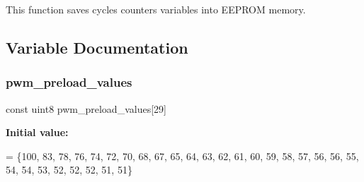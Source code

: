 This function saves cycles counters variables into E\+E\+P\+R\+OM memory. 

\subsection{Variable Documentation}
\mbox{\label{interruptions_8c_aee1865719263cf20251f918e8825703d}} 
\subsubsection{pwm\+\_\+preload\+\_\+values}
{\footnotesize\ttfamily const uint8 pwm\+\_\+preload\+\_\+values[29]\hspace{0.3cm}{\ttfamily [static]}}

{\bfseries Initial value\+:}
\begin{DoxyCode}
= \{100,    
                                              83,
                                              78,
                                              76,
                                              74,
                                              72,    
                                              70,
                                              68,
                                              67,
                                              65,
                                              64,    
                                              63,
                                              62,
                                              61,
                                              60,
                                              59,    
                                              58,
                                              57,
                                              56,
                                              56,
                                              55,    
                                              54,
                                              54,
                                              53,
                                              52,
                                              52,    
                                              52,
                                              51,
                                              51\}
\end{DoxyCode}
